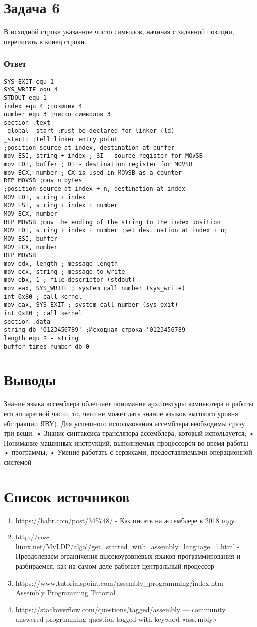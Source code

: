 \documentclass[12pt]{article}
\begin{document}
\section*{Задача 6}
В исходной строке указанное число символов, начиная с заданной позиции,
переписать в конец строки.
\subsubsection*{Ответ}
\begin{verbatim}
SYS_EXIT equ 1
SYS_WRITE equ 4
STDOUT equ 1
index equ 4 ;позиция 4
number equ 3 ;число символов 3
section .text
 global _start ;must be declared for linker (ld)
_start: ;tell linker entry point
;position source at index, destination at buffer
mov ESI, string + index ; SI - source register for MOVSB
mov EDI, buffer ; DI - destination register for MOVSB
mov ECX, number ; CX is used in MOVSB as a counter
REP MOVSB ;mov n bytes
;position source at index + n, destination at index
MOV EDI, string + index
MOV ESI, string + index + number
MOV ECX, number
REP MOVSB ;mov the ending of the string to the index position
MOV EDI, string + index + number ;set destination at index + n;
MOV ESI, buffer
MOV ECX, number
REP MOVSB
mov edx, length ; message length
mov ecx, string ; message to write
mov ebx, 1 ; file descriptor (stdout)
mov eax, SYS_WRITE ; system call number (sys_write)
int 0x80 ; call kernel
mov eax, SYS_EXIT ; system call number (sys_exit)
int 0x80 ; call kernel
section .data
string db '0123456789' ;Исходная строка '0123456789'
length equ $ - string
buffer times number db 0
\end{verbatim}
\section*{Выводы}
Знание языка ассемблера облегчает понимание архитектуры компьютера и
работы его аппаратной части, то, чего не может дать знание языков высокого уровня
абстракции ЯВУ). Для успешного использования ассемблера необходимы сразу три вещи:
• Знание синтаксиса транслятора ассемблера, который используется;
• Понимание машинных инструкций, выполняемых процессором во время работы
• программы;
• Умение работать с сервисами, предоставляемыми операционной системой
\section*{Список источников}
\begin{enumerate} 
\item https://habr.com/post/345748/ - Как писать на ассемблере в 2018 году.
\item http://rus-linux.net/MyLDP/algol/get\_started\_with\_assembly\_language\_1.html -
Преодолеваем ограничения высокоуровневых языков программирования и разбираемся,
как на самом деле работает центральный процессор
\item https://www.tutorialspoint.com/assembly\_programming/index.htm - Assembly Programming Tutorial
\item https://stackoverflow.com/questions/tagged/assembly — community answered programming
question tagged with keyword «assembly»
\end{enumerate} 
\end{document}
